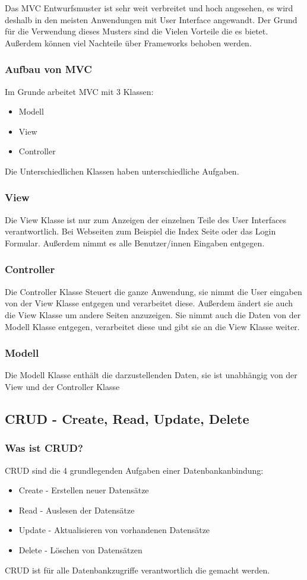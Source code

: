 Das MVC Entwurfsmuster ist sehr weit verbreitet und hoch angesehen, es wird deshalb in den meisten Anwendungen mit User Interface angewandt. Der Grund für die Verwendung dieses Musters sind die Vielen Vorteile die es bietet. Außerdem können viel Nachteile über Frameworks behoben werden.

\subsubsection{Aufbau von MVC}
Im Grunde arbeitet MVC mit 3 Klassen:
\begin{itemize}
	\item Modell
	\item View
	\item Controller
\end{itemize}
Die Unterschiedlichen Klassen haben unterschiedliche Aufgaben.

\subsubsection{View}
Die View Klasse ist nur zum Anzeigen der einzelnen Teile des User Interfaces verantwortlich. Bei Webseiten zum Beispiel die Index Seite oder das Login Formular. Außerdem nimmt es alle Benutzer/innen Eingaben entgegen.
\subsubsection{Controller}
Die Controller Klasse Steuert die ganze Anwendung, sie nimmt die User eingaben von der View Klasse entgegen und verarbeitet diese. Außerdem ändert sie auch die View Klasse um andere Seiten anzuzeigen. Sie nimmt auch die Daten von der Modell Klasse entgegen, verarbeitet diese und gibt sie an die View Klasse weiter.
\subsubsection{Modell}
Die Modell Klasse enthält die darzustellenden Daten, sie ist unabhängig von der View und der Controller Klasse

\subsection{CRUD - Create, Read, Update, Delete} \label{sec:CRUD}

\subsubsection{Was ist CRUD?}
CRUD sind die 4 grundlegenden Aufgaben einer Datenbankanbindung:
\begin{itemize}
	\item Create - Erstellen neuer Datensätze
	\item Read - Auslesen der Datensätze
	\item Update - Aktualisieren von vorhandenen Datensätze
	\item Delete - Löschen von Datensätzen
\end{itemize}
\cite{CRUD}
\newline
CRUD ist für alle Datenbankzugriffe verantwortlich die gemacht werden.


